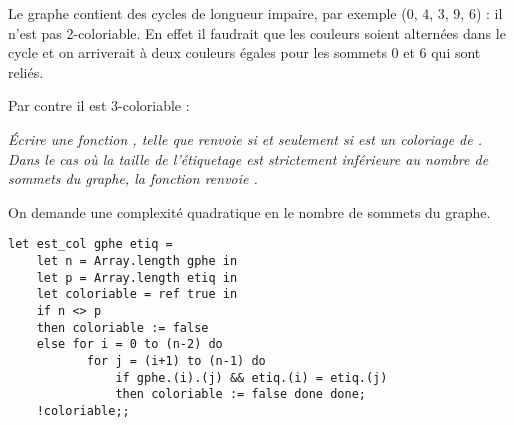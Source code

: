 \begin{Answer}
Le graphe contient des cycles de longueur impaire, par exemple (0, 4, 3, 9, 6) : il n'est pas 2-coloriable. En effet il faudrait que les couleurs soient alternées dans le cycle et on arriverait à deux couleurs égales pour les sommets 0 et 6 qui sont reliés.

Par contre il est 3-coloriable :

\begin{center}
\end{center}
\end{Answer}
\begin{Exercise}\it
Écrire une fonction , telle que  renvoie  si et seulement si  est un coloriage de . Dans le cas où la taille de l'étiquetage est strictement inférieure au nombre de sommets du graphe, la fonction renvoie . 

On demande une complexité quadratique en le nombre de sommets du graphe. 
\end{Exercise} 
\begin{Answer}
\begin{lstlisting}
let est_col gphe etiq =
    let n = Array.length gphe in
    let p = Array.length etiq in
    let coloriable = ref true in
    if n <> p
    then coloriable := false
    else for i = 0 to (n-2) do
           for j = (i+1) to (n-1) do
               if gphe.(i).(j) && etiq.(i) = etiq.(j)
               then coloriable := false done done;
    !coloriable;;
\end{lstlisting}
\end{Answer}
